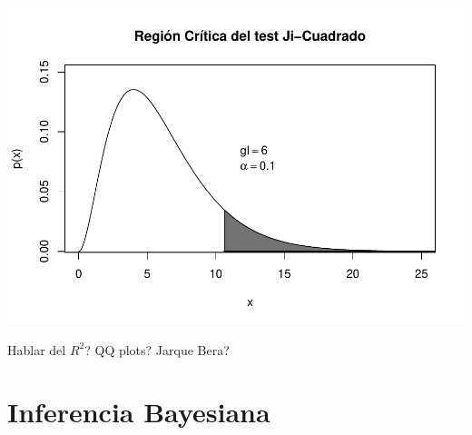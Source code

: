 \documentclass[]{article}
\begin{document}
\includegraphics{NotaDeClaseLong_files/figure-latex/unnamed-chunk-18-3.pdf}

Hablar del \(R^2\)? QQ plots? Jarque Bera?

\hypertarget{inferencia-bayesiana}{%
\section{Inferencia Bayesiana}\label{inferencia-bayesiana}}
\end{document}
